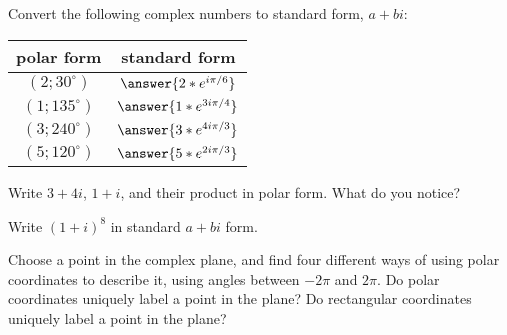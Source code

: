 \documentclass[space,nooutcomes]{ximera}
\begin{document}
\begin{problem}
Convert the following complex numbers to standard form, $a+bi$: 

\begin{center}
\begin{tabular}{c | c}
polar form & standard form \\
\hline
$(2; 30^\circ)$  & $\answer{2*e^{i\pi/6}}$ \\
$(1; 135^\circ)$ & $\answer{1*e^{3i\pi/4}}$ \\
$(3; 240^\circ)$ & $\answer{3*e^{4i\pi/3}}$ \\
$(5; 120^\circ)$ & $\answer{5*e^{2i\pi/3}}$ \\
 \end{tabular}
\end{center}
\end{problem}

\newpage 

\begin{problem}
Write $3 + 4i$, $1 + i$, and their product in polar form.  What do you notice?  
\vfill 
\end{problem}

\begin{problem}
Write $(1 + i)^8$ in standard $a + bi$ form.  
\vfill 
\end{problem}

\begin{problem}
Choose a point in the complex plane, and find four different ways of using polar coordinates to describe it, using angles between $-2\pi$ and $2\pi$.  
Do polar coordinates uniquely label a point in the plane?
Do rectangular coordinates uniquely label a point in the plane?
\vfill 
\end{problem}
\end{document}
